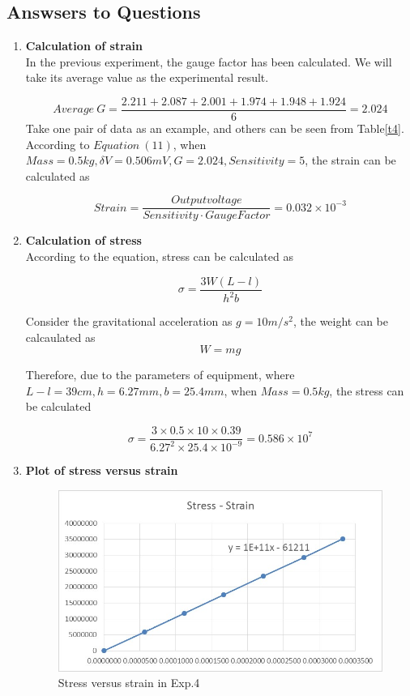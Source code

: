 \documentclass[11pt,a4paper,twoside]{article}
\begin{document}
\pagebreak


\subsection{Answsers to Questions}
\begin{enumerate}
\item
\textbf{Calculation of strain }\\
In the previous experiment, the gauge factor has been calculated. We will take its average value as the experimental result.

\begin{equation*}
Average\ G =\frac{2.211+2.087+2.001+1.974+1.948+1.924}{6}=2.024
\end{equation*}
Take one pair of data as an example, and others can be seen from Table\ref{t4}. According to $Equation\ (11)$, when $Mass=0.5kg,\delta V=0.506mV, G=2.024,Sensitivity=5$, the strain can be calculated as

	\begin{equation*}
	Strain = \frac{Output voltage}{Sensitivity \cdot Gauge Factor}=0.032\times 10^{-3} 
	\end{equation*}
\item
\textbf{Calculation of stress} \\
According to the equation, stress can be calculated as 

\begin{equation}
\sigma = \frac{3W(L-l)}{h^{2}b}
\end{equation}

Consider the gravitational acceleration as $g=10m/s^{2}$, the weight can be calcaulated as 
\begin{equation}
W=mg
\end{equation}


Therefore, due to the parameters of equipment, where $L-l=39cm, h=6.27mm, b=25.4mm$, when $Mass=0.5kg$, the stress can be calculated 

\begin{equation*}
\sigma = \frac{3\times 0.5\times 10\times 0.39}{6.27^{2}\times 25.4\times 10^{-9}}=0.586\times 10^{7}
\end{equation*}

\item 
\textbf{Plot of stress versus strain}\\

\begin{figure}[!h]
	\centering
	\includegraphics[width=0.7\linewidth]{8}
	\caption{Stress versus strain in Exp.4}
	\label{f8}
\end{figure}


\end{enumerate}
\end{document}
